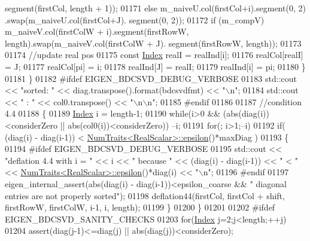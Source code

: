 \begin{DoxyCode}
      segment(firstCol, length + 1));
01171       \textcolor{keywordflow}{else}         m\_naiveU.col(firstCol+i).segment(0, 2)                .swap(m\_naiveU.col(firstCol+J).
      segment(0, 2));
01172       \textcolor{keywordflow}{if} (m\_compV) m\_naiveV.col(firstColW + i).segment(firstRowW, length).swap(m\_naiveV.col(firstColW + J).
      segment(firstRowW, length));
01173 
01174       \textcolor{comment}{//update real pos}
01175       \textcolor{keyword}{const} \hyperlink{namespace_eigen_a62e77e0933482dafde8fe197d9a2cfde}{Index} realI = realInd[i];
01176       realCol[realI] = J;
01177       realCol[pi] = i;
01178       realInd[J] = realI;
01179       realInd[i] = pi;
01180     \}
01181   \}
01182 \textcolor{preprocessor}{#ifdef EIGEN\_BDCSVD\_DEBUG\_VERBOSE}
01183   std::cout << \textcolor{stringliteral}{"sorted: "} << diag.transpose().format(bdcsvdfmt) << \textcolor{stringliteral}{"\(\backslash\)n"};
01184   std::cout << \textcolor{stringliteral}{"      : "} << col0.transpose() << \textcolor{stringliteral}{"\(\backslash\)n\(\backslash\)n"};
01185 \textcolor{preprocessor}{#endif}
01186     
01187   \textcolor{comment}{//condition 4.4}
01188   \{
01189     \hyperlink{namespace_eigen_a62e77e0933482dafde8fe197d9a2cfde}{Index} i = length-1;
01190     \textcolor{keywordflow}{while}(i>0 && (abs(diag(i))<considerZero || abs(col0(i))<considerZero)) --i;
01191     \textcolor{keywordflow}{for}(; i>1;--i)
01192        \textcolor{keywordflow}{if}( (diag(i) - diag(i-1)) < \hyperlink{group___core___module_struct_eigen_1_1_num_traits}{NumTraits<RealScalar>::epsilon}()*maxDiag )
01193       \{
01194 \textcolor{preprocessor}{#ifdef EIGEN\_BDCSVD\_DEBUG\_VERBOSE}
01195         std::cout << \textcolor{stringliteral}{"deflation 4.4 with i = "} << i << \textcolor{stringliteral}{" because "} << (diag(i) - diag(i-1)) << \textcolor{stringliteral}{" < "} << 
      \hyperlink{group___core___module_struct_eigen_1_1_num_traits}{NumTraits<RealScalar>::epsilon}()*diag(i) << \textcolor{stringliteral}{"\(\backslash\)n"};
01196 \textcolor{preprocessor}{#endif}
01197         eigen\_internal\_assert(abs(diag(i) - diag(i-1))<epsilon\_coarse && \textcolor{stringliteral}{" diagonal entries are not
       properly sorted"});
01198         deflation44(firstCol, firstCol + shift, firstRowW, firstColW, i-1, i, length);
01199       \}
01200   \}
01201   
01202 \textcolor{preprocessor}{#ifdef EIGEN\_BDCSVD\_SANITY\_CHECKS}
01203   \textcolor{keywordflow}{for}(\hyperlink{namespace_eigen_a62e77e0933482dafde8fe197d9a2cfde}{Index} j=2;j<length;++j)
01204     assert(diag(j-1)<=diag(j) || abs(diag(j))<considerZero);

\end{DoxyCode}
